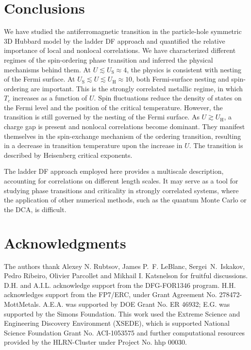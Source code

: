\documentclass[aps,prb,twocolumn,amsmath,notitlepage,floatfix,footinbib,superscriptaddress,showpacs, showkeys]{revtex4-1}
\begin{document}
\section{Conclusions}
We have studied the antiferromagnetic transition in the particle-hole symmetric 3D Hubbard model by the ladder DF approach and quantified the relative importance of local and nonlocal correlations. 
We have characterized different regimes of the spin-ordering phase transition and inferred the physical mechanisms behind them.  
At $U \lesssim U_\text{S} \approx 4$, the physics is consistent with nesting of the Fermi surface. 
At $U_\text{S} \lesssim U \lesssim U_\text{H} \approx 10$, both Fermi-surface nesting and spin-ordering are important. 
This is the strongly correlated metallic regime, in which $T_c$ increases as a function of $U$. 
Spin fluctuations reduce the density of states on the Fermi level and the position of the critical temperature. However, the transition is still governed by the nesting of the Fermi surface.
As $U \gtrsim U_\text{H}$, a charge gap is present and nonlocal correlations become dominant. They manifest themselves in the spin-exchange mechanism of the ordering transition, resulting in a decrease in transition temperature upon the increase in $U$. 
The transition is described by Heisenberg critical exponents.

The ladder DF approach employed here provides a multiscale description, accounting for correlations on different length scales.
It may serve as a tool for studying phase transitions and criticality in strongly correlated systems, where the application of other numerical methods, such as the quantum Monte Carlo or the DCA, is difficult. 

\section{Acknowledgments} 

The authors thank Alexey N. Rubtsov, James P.~F. LeBlanc, Sergei~N.~Iskakov, Pedro Ribeiro, Olivier Parcollet and Mikhail I. Katsnelson for fruitful discussions. D.H. and A.I.L. acknowledge support from the DFG-FOR1346 program. H.H. acknowledges support from the FP7/ERC, under Grant Agreement No. 278472-MottMetals. A.E.A. was supported by DOE Grant No. ER 46932; E.G. was supported by the Simons Foundation. This work used the Extreme Science and Engineering Discovery Environment (XSEDE), which is supported National Science Foundation Grant No. ACI-1053575 and further computational resources provided by the HLRN-Cluster under Project No. hhp 00030.
\end{document}
